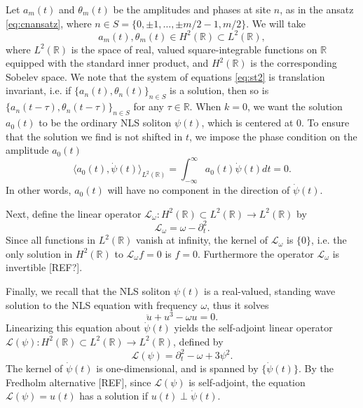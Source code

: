 \documentclass[11pt,reqno]{amsart}
\def\R{{\mathbb R}}
\def\calL{{\mathcal L}}
\def\Lw{{\mathcal{L}_\omega}}
\begin{document}
Let $a_m(t)$ and $\theta_m(t)$ be the amplitudes and phases at site $n$, as in the ansatz \cref{eq:cnansatz}, where $n \in S = \{ 0, \pm 1, \dots, \pm m/2-1, m/2 \}$. We will take 
\[
a_m(t), \theta_m(t) \in H^2(\R) \subset L^2(\R),
\]
where $L^2(\R)$ is the space of real, valued square-integrable functions on $\R$ equipped with the standard inner product, and $H^2(\R)$ is the corresponding Sobelev space. We note that the system of equations \cref{eq:st2} is translation invariant, i.e. if $\{ a_n(t), \theta_n(t)\}_{n\in S}$ is a solution, then so is $\{ a_n(t-\tau), \theta_n(t-\tau)\}_{n\in S}$ for any $\tau \in \R$. When $k = 0$, we want the solution $a_0(t)$ to be the ordinary NLS soliton $\psi(t)$, which is centered at 0. To ensure that the solution we find is not shifted in $t$, we impose the phase condition on the amplitude $a_0(t)$
\begin{equation}\label{eq:phasecond}
\langle a_0(t), \dot{\psi}(t) \rangle_{L^2(\R)} = \int_{-\infty}^\infty a_0(t) \dot{\psi}(t) dt = 0.
\end{equation}
In other words, $a_0(t)$ will have no component in the direction of $\dot{\psi}(t)$.

Next, define the linear operator $\Lw: H^2(\R) \subset L^2(\R) \rightarrow L^2(\R)$ by
\begin{equation}\label{eq:Lw}
\Lw = \omega - \partial_t^2.
\end{equation}
Since all functions in $L^2(\R)$ vanish at infinity, the kernel of $\Lw$ is $\{0\}$, i.e. the only solution in $H^2(\R)$ to $\Lw f = 0$ is $f = 0$. Furthermore the operator $\Lw$ is invertible [REF?].

Finally, we recall that the NLS soliton $\psi(t)$ is a real-valued, standing wave solution to the NLS equation with frequency $\omega$, thus it solves 
\begin{equation}\label{eq:NLSreal}
\ddot{u} + u^3 - \omega u = 0. 
\end{equation}
Linearizing this equation about $\dot{\psi}(t)$ yields the self-adjoint linear operator $\calL(\psi): H^2(\R) \subset L^2(\R) \rightarrow L^2(\R)$, defined by
\begin{equation}\label{eq:Lpsi}
\calL(\psi) = \partial_t^2 - \omega + 3 \psi^2.
\end{equation}
The kernel of $\dot{\psi}(t)$ is one-dimensional, and is spanned by $\{ \dot{\psi}(t) \}$. By the Fredholm alternative [REF], since $\calL(\psi)$ is self-adjoint, the equation $\calL(\psi) = u(t)$ has a solution if $u(t) \perp \dot{\psi}(t)$.
\end{document}
